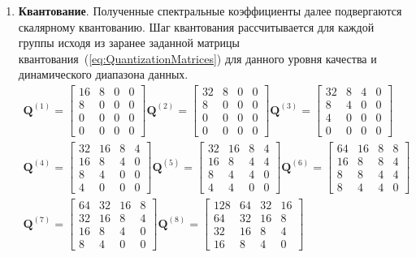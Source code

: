\begin{enumerate}
  \item\label{DVCEncoder:Quantization} \textbf{Квантование}. Полученные спектральные коэффициенты  далее подвергаются скалярному квантованию. Шаг квантования рассчитывается для каждой группы исходя из заранее заданной матрицы квантования~(\ref{eq:QuantizationMatrices}) для данного уровня качества и динамического диапазона данных.
  \begin{gather}
  \mathbf{Q}^{(1)} =
  \begin{bmatrix}
  16 & 8 & 0 & 0 \\
  8 & 0 & 0 & 0 \\
  0 & 0 & 0 & 0 \\
  0 & 0 & 0 & 0
  \end{bmatrix}
  \mathbf{Q}^{(2)} =
  \begin{bmatrix}
  32 & 8 & 0 & 0 \\
  8 & 0 & 0 & 0 \\
  0 & 0 & 0 & 0 \\
  0 & 0 & 0 & 0
  \end{bmatrix}
  \mathbf{Q}^{(3)} =
  \begin{bmatrix}
  32 & 8 & 4 & 0 \\
  8 & 4 & 0 & 0 \\
  4 & 0 & 0 & 0 \\
  0 & 0 & 0 & 0
  \end{bmatrix}
  \nonumber\\
  \mathbf{Q}^{(4)} =
  \begin{bmatrix}
  32 & 16 & 8 & 4 \\
  16 & 8 & 4 & 0 \\
  8 & 4 & 0 & 0 \\
  4 & 0 & 0 & 0
  \end{bmatrix}
  \mathbf{Q}^{(5)} =
  \begin{bmatrix}
  32 & 16 & 8 & 4 \\
  16 & 8 & 4 & 4 \\
  8 & 4 & 4 & 0 \\
  4 & 4 & 0 & 0
  \end{bmatrix}
  \mathbf{Q}^{(6)} =
  \begin{bmatrix}
  64 & 16 & 8 & 8 \\
  16 & 8 & 8 & 4 \\
  8 & 8 & 4 & 4 \\
  8 & 4 & 4 & 0
  \end{bmatrix}
  \nonumber \\
  \mathbf{Q}^{(7)} =
  \begin{bmatrix}
  64 & 32 & 16 & 8 \\
  32 & 16 & 8 & 4 \\
  16 & 8 & 4 & 0 \\
  8 & 4 & 0 & 0
  \end{bmatrix}
  \mathbf{Q}^{(8)} =
  \begin{bmatrix}
  128 & 64 & 32 & 16 \\
  64 & 32& 16 & 8 \\
  32 & 16 & 8 & 4 \\
  16 & 8 & 4 & 0
  \end{bmatrix}
  \label{eq:QuantizationMatrices}
  \end{gather}
  

\end{enumerate}
